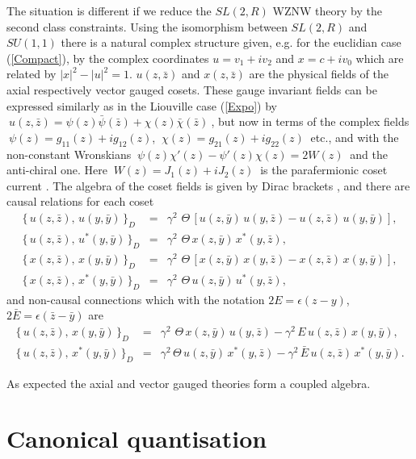 \documentclass[a4paper,12]{article}
\begin{document}
The situation is different if we reduce the $SL(2,R)$ WZNW theory by
the second class constraints. Using the isomorphism between $SL(2,R)$
and $SU(1, 1)$ there is a natural complex structure given, e.g. for
the euclidian case (\ref{Compact}), by the complex coordinates
$u=v_1+iv_2$ and $x=c+iv_0$ which are related by $|x|^2-|u|^2=1$.
$u(z,\bar z)$ and $x(z,\bar z)$ are the physical fields of the axial
respectively vector gauged cosets. These gauge invariant fields can be
expressed similarly as in the Liouville case (\ref{Expo}) by
$~u(z,\bar z)=\psi (z)\bar\psi (\bar z)+\chi (z)\bar\chi (\bar z)~$,
but now in terms of the complex fields
$~\psi(z)=g_{11}(z)+ig_{12}(z)$, $~\chi(z)=g_{21}(z)+ig_{22}(z)~$
etc., and with the non-constant Wronskians
$~\psi(z)\chi'(z)-\psi'(z)\chi(z)=2W(z)~$ and the anti-chiral one.
Here $~W(z)=J_1(z)+iJ_2(z)~$ is the parafermionic coset current
\cite{MW, FJW}.  The algebra of the coset fields is given by
Dirac brackets \cite{FJW2}, and there are causal relations for each
 coset
\begin{eqnarray}\label{DB-u-u}
\{\,u(z,\bar z),\, u(y,\bar y)\,\}_D&=&\gamma^2\,
\,\Theta\,
[u(z,\bar y)\,u(y,\bar z)-
u(z,\bar z)\,u(y,\bar y)],\nonumber \\
\{\,u(z,\bar z),\, u^*(y,\bar y)\,\}_D&=&\gamma^2\,
\,\Theta\,
 x(z,\bar y)\,x^*(y,\bar z),\nonumber\\
\{\,x(z,\bar z),\, x(y,\bar y)\,\}_D&=&\gamma^2\,
\,\Theta\,
[x(z,\bar y)\,x(y,\bar z)-
x(z,\bar z)\,x(y,\bar y)],\nonumber\\
\{\,x(z,\bar z),\, x^*(y,\bar y)\,\}_D&=&\gamma^2\,
\,\Theta\,
u(z,\bar y)\,u^*(y,\bar z),
\end{eqnarray}
and non-causal connections which with the  notation
$2E =\epsilon(z-y)$,  $2\bar E =\epsilon(\bar z-\bar y)$
are
\begin{eqnarray}
\label{DB-u-x}
\{\,u(z,\bar z),\, x(y,\bar y)\,\}_D&=&\gamma^2\,
\,\Theta\,
x(z,\bar y)\,u(y,\bar z)-
\gamma^2\, E\,u(z,\bar z)\,x(y,\bar y),\nonumber\\
\{\,u(z,\bar z),\, x^*(y,\bar y)\,\}_D&=&\gamma^2\,
\Theta\,
u(z,\bar y)\,x^*(y,\bar z)-
\gamma^2\,\bar E\, u(z,\bar z)\,x^*(y,\bar y).
\end{eqnarray}

As expected the axial and vector gauged theories form a
coupled algebra.

\section{Canonical quantisation}
\end{document}
